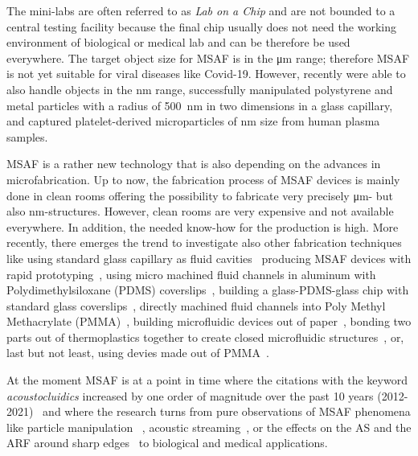 The mini-labs are often referred to as \emph{Lab on a Chip} and are not bounded 
to a central testing facility because the final chip usually does not need the 
working environment of biological or medical lab and can be therefore be used 
everywhere. The target object size for MSAF is in the \si{\um} range; therefore 
MSAF is not yet suitable for viral diseases like Covid-19. However, recently 
 were able to also handle objects in the \si{\nano\meter} range, 
 successfully manipulated polystyrene and metal particles with 
a radius of \SI{500}{\nm} in two dimensions in a glass capillary, and 
 captured platelet-derived microparticles of \si{\nm} size 
from human plasma samples.

MSAF is a rather new technology that is also depending on the advances in 
microfabrication. Up to now, the fabrication process of MSAF devices is mainly 
done in clean rooms offering the possibility to fabricate very precisely 
\si{\um}- but also \si{\nm}-structures. However, clean rooms are very expensive 
and not available everywhere. In addition, the needed know-how for the 
production is high. More recently, there emerges the trend to investigate also 
other fabrication techniques like using standard glass capillary as fluid 
cavities~\cite{Wiklund2001,Hammarstrom2010,Hammarstrom2012,Mishra2014,Gralinski2014,Gerlt2022} 
producing MSAF devices with rapid prototyping~\cite{Adams2012}, using micro 
machined fluid channels in aluminum with Polydimethylsiloxane (PDMS) 
coverslips~\cite{Gautam2018}, building a glass-PDMS-glass chip with standard 
glass coverslips~\cite{Xu2019}, directly machined fluid channels into Poly 
Methyl Methacrylate (PMMA)~\cite{Harris2012}, building microfluidic devices out 
of paper~\cite{Martinez2010}, bonding two parts out of thermoplastics together 
to create closed microfluidic structures~\cite{Mueller2013}, or, last but not 
least, using devies made out of PMMA~\cite{Gonzalez2015,Yang2017}.

At the moment MSAF is at a point in time where the citations with the keyword 
\emph{acoustocluidics} increased by one order of magnitude over the past 10 
years (2012-2021)~\cite{Novotny2021} and where the research turns from pure 
observations of MSAF phenomena like particle 
manipulation~\cite{Wiklund2012a,Laurell2007,Collins2016,Gedge2012,Ding2012b,Cetin2016b,Aubert2016,Novotny2021}
, acoustic streaming~\cite{Hoyos2013,Castro2016,Lei2016}, or the effects on the 
AS and the ARF around sharp 
edges~\cite{Leibacher2015,Chen2021,Doinikov2020,Doinikov2020b} to biological 
and medical applications.

